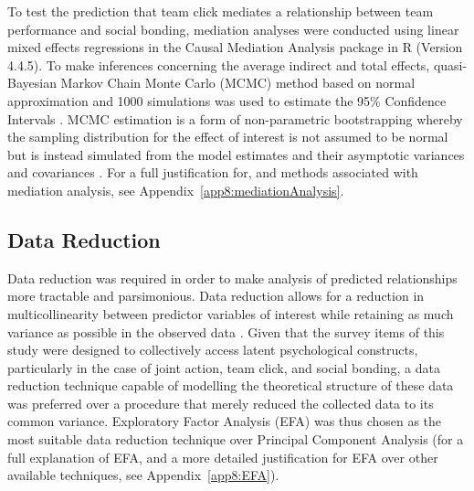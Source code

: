 \begin{CJK}{UTF8}{gbsn}
To test the prediction that team click mediates a relationship between team performance and social bonding, mediation analyses were conducted using linear mixed effects regressions in the Causal Mediation Analysis package in R (Version 4.4.5).  To make inferences concerning the average indirect and total effects, quasi-Bayesian Markov Chain Monte Carlo (MCMC) method based on normal approximation and 1000 simulations was used to estimate the 95\% Confidence Intervals \citep{Tofighi2016a,Imai2010}. MCMC estimation is a form of non-parametric bootstrapping whereby the sampling distribution for the effect of interest is not assumed to be normal but is instead simulated from the model estimates and their asymptotic variances and covariances \citep{Preacher2008}.  For a full justification for, and methods associated with mediation analysis, see Appendix~\ref{app8:mediationAnalysis}.

\subsection{Data Reduction\label{Ch5:dataReduction}}
Data reduction was required in order to make analysis of predicted relationships more tractable and parsimonious.  Data reduction allows for a reduction in multicollinearity between predictor variables of interest while retaining as much variance as possible in the observed data \citep{Yong2013}.  Given that the survey items of this study were designed to collectively access latent psychological constructs, particularly in the case of joint action, team click, and social bonding, a data reduction technique capable of modelling the theoretical structure of these data was preferred over a procedure that merely reduced the collected data to its common variance. Exploratory Factor Analysis (EFA) was thus chosen as the most suitable data reduction technique over Principal Component Analysis (for a full explanation of EFA, and a more detailed justification for EFA over other available techniques, see Appendix~\ref{app8:EFA}).


\end{CJK}
